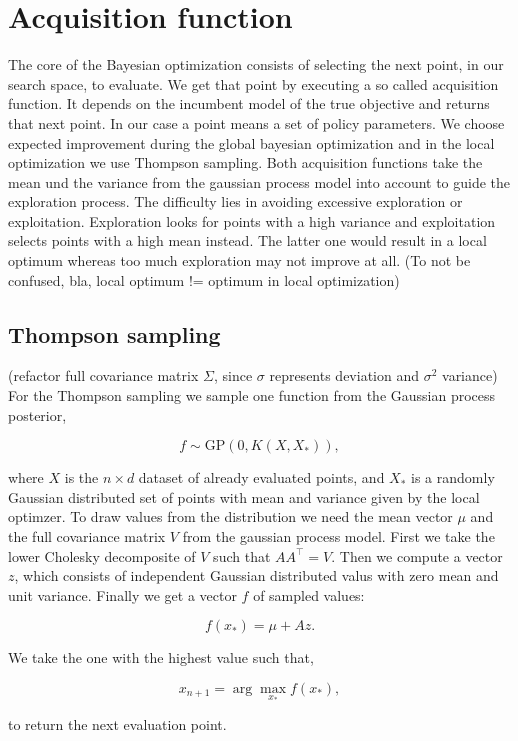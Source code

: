 \section{Acquisition function}
The core of the Bayesian optimization consists of selecting the next point, in our search space, to evaluate. We get that point by executing a so called acquisition function. It depends on the incumbent model of the true objective and returns that next point. In our case a point means a set of policy parameters.
We choose expected improvement during the global bayesian optimization and in the local optimization we use Thompson sampling. Both acquisition functions take the mean und the variance from the gaussian process model into account to guide the exploration process. The difficulty lies in avoiding excessive exploration or exploitation. Exploration looks for points with a high variance and exploitation selects points with a high mean instead. The latter one would result in a local optimum whereas too much exploration may not improve at all. (To not be confused, bla, local optimum != optimum in local optimization)

\subsection{Thompson sampling}
(refactor full covariance matrix $\Sigma$, since $\sigma$ represents deviation and $\sigma^2$ variance)
For the Thompson sampling we sample one function from the Gaussian process posterior,

$$f\sim \mathrm{GP}(0,K(X,X_*)),$$

where $X$ is the $n\times d$ dataset of already evaluated points, and $X_*$ is a randomly Gaussian distributed set of points with mean and variance given by the local optimzer.
To draw values from the distribution we need the mean vector $\mu$ and the full covariance matrix $V$ from the gaussian process model. First we take the lower Cholesky decomposite of $V$ such that $A A^\top = V$. Then we compute a vector $z$, which consists of independent Gaussian distributed valus with zero mean and unit variance. Finally we get a vector $f$ of sampled values:

$$f(x_*) = \mu + A z.$$

We take the one with the highest value such that,

$$x_{n+1} = \arg \max_{x_*} f(x_*),$$

to return the next evaluation point.

